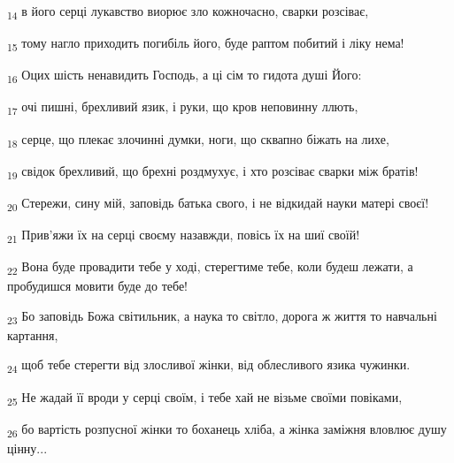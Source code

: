 \begin{tcolorbox}
\textsubscript{14} в його серці лукавство виорює зло кожночасно, сварки розсіває,
\end{tcolorbox}
\begin{tcolorbox}
\textsubscript{15} тому нагло приходить погибіль його, буде раптом побитий і ліку нема!
\end{tcolorbox}
\begin{tcolorbox}
\textsubscript{16} Оцих шість ненавидить Господь, а ці сім то гидота душі Його:
\end{tcolorbox}
\begin{tcolorbox}
\textsubscript{17} очі пишні, брехливий язик, і руки, що кров неповинну ллють,
\end{tcolorbox}
\begin{tcolorbox}
\textsubscript{18} серце, що плекає злочинні думки, ноги, що сквапно біжать на лихе,
\end{tcolorbox}
\begin{tcolorbox}
\textsubscript{19} свідок брехливий, що брехні роздмухує, і хто розсіває сварки між братів!
\end{tcolorbox}
\begin{tcolorbox}
\textsubscript{20} Стережи, сину мій, заповідь батька свого, і не відкидай науки матері своєї!
\end{tcolorbox}
\begin{tcolorbox}
\textsubscript{21} Прив'яжи їх на серці своєму назавжди, повісь їх на шиї своїй!
\end{tcolorbox}
\begin{tcolorbox}
\textsubscript{22} Вона буде провадити тебе у ході, стерегтиме тебе, коли будеш лежати, а пробудишся мовити буде до тебе!
\end{tcolorbox}
\begin{tcolorbox}
\textsubscript{23} Бо заповідь Божа світильник, а наука то світло, дорога ж життя то навчальні картання,
\end{tcolorbox}
\begin{tcolorbox}
\textsubscript{24} щоб тебе стерегти від злосливої жінки, від облесливого язика чужинки.
\end{tcolorbox}
\begin{tcolorbox}
\textsubscript{25} Не жадай її вроди у серці своїм, і тебе хай не візьме своїми повіками,
\end{tcolorbox}
\begin{tcolorbox}
\textsubscript{26} бо вартість розпусної жінки то боханець хліба, а жінка заміжня вловлює душу цінну...
\end{tcolorbox}
